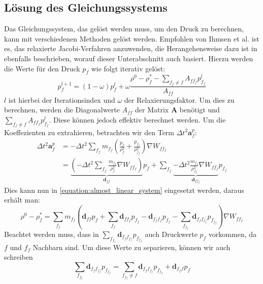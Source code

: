 \documentclass{scrreprt}
\begin{document}
\subsection{Lösung des Gleichungssystems}
Das Gleichungssystem, das gelöst werden muss, um den Druck zu berechnen, kann mit verschiedenen Methoden gelöst werden.
Empfohlen von Ihmsen et al. \cite{ihmsen_implicit_2014} ist es, das relaxierte Jacobi-Verfahren anzuwenden,
die Herangehensweise dazu ist in \cite{ihmsen_implicit_2014} ebenfalls beschrieben, worauf dieser Unterabschnitt auch basiert.
Hierzu werden die Werte für den Druck $p_f$ wie folgt iterativ gelöst:
\begin{equation}
    \label{equation:iterative_pressure_update}
    p_f^{l+1} = (1 - \omega) p_f^l + \omega \frac{\rho^0 - \rho_f^* - \sum_{f_f \neq f} A_{ff_f} p_{f_f}^l}{A_{ff}}
\end{equation}
$l$ ist hierbei der Iterationsindex und $\omega$ der Relaxierungsfaktor.
Um dies zu berechnen, werden die Diagonalwerte $A_{ff}$ der Matrix $\textbf{A}$ benötigt und $\sum_{f_f \neq f} A_{ff_f} p_{f_f}^l$.
Diese können jedoch effektiv berechnet werden.
Um die Koeffezienten zu extrahieren, betrachten wir den Term $\Delta t^2 \textbf{a}_f^p$:
\begin{align}
    \Delta t^2 \textbf{a}_f^p &= -\Delta t^2 \sum_{f_f} m_{f_f} \left(\frac{p_f}{\rho_f^2} + \frac{p_{f_f}}{\rho_{f_f}^2}\right) \nabla W_{ff_f}\\
        &= \underbrace{\left(-\Delta t^2 \sum_{f_f} \frac{m_{f_f}}{\rho_f^2} \nabla W_{ff_f}\right)}_{\textbf{d}_{ff}} p_f
            + \sum_{f_f} \underbrace{-\Delta t^2 \frac{m_{f_f}}{\rho_{f_f}^2} \nabla W_{ff_f}}_{\textbf{d}_{ff_f}} p_{f_f}
\end{align}
Dies kann nun in \eqref{equation:almost_linear_system} eingesetzt werden, daraus erhält man:
\begin{equation}
    \label{equation:density_difference_not_seperated}
    \rho^0 - \rho_f^* =
     \sum_{f_f} m_{f_f} \left(\textbf{d}_{ff} p_f + \sum_{f_f} \textbf{d}_{ff_f} p_{f_f}
     - \textbf{d}_{f_f f_f} p_{f_f} - \sum_{f_{f_f}} \textbf{d}_{f_f f_{f_f}} p_{f_{f_f}}\right) \nabla W_{ff_f}
\end{equation}
Beachtet werden muss, dass in $\sum_{f_{f_f}} \textbf{d}_{f_f f_{f_f}} p_{f_{f_f}}$ auch Druckwerte $p_f$ vorkommen, da $f$ und $f_f$ Nachbarn sind.
Um diese Werte zu separieren, können wir auch schreiben
\begin{equation}
    \sum_{f_{f_f}} \textbf{d}_{f_f f_{f_f}} p_{f_{f_f}} = \sum_{f_{f_f} \neq f} \textbf{d}_{f_f f_{f_f}} p_{f_{f_f}} + \textbf{d}_{f_f f} p_f
\end{equation}
\end{document}
